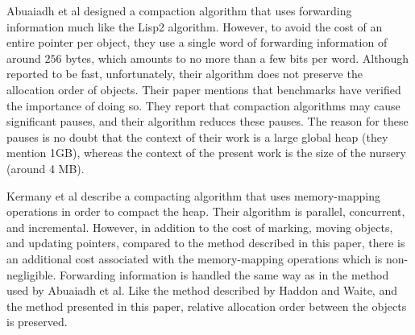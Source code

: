 Abuaiadh et al \cite{Abuaiadh:2004:EPH:1028976.1028995} designed a
compaction algorithm that uses forwarding information much like the
Lisp2 algorithm.  However, to avoid the cost of an entire pointer per
object, they use a single word of forwarding information of around
$256$ bytes, which amounts to no more than a few bits per word.
Although reported to be fast, unfortunately, their algorithm does not
preserve the allocation order of objects.  Their paper mentions that
benchmarks have verified the importance of doing so.  They report that
compaction algorithms may cause significant pauses, and their
algorithm reduces these pauses.  The reason for these pauses is no
doubt that the context of their work is a large global heap (they
mention 1GB), whereas the context of the present work is the size of
the nursery (around 4 MB).

Kermany et al \cite{Kermany:2006:CCI:1133981.1134023} describe a
compacting algorithm that uses memory-mapping operations in order to
compact the heap.  Their algorithm is parallel, concurrent, and
incremental.  However, in addition to the cost of marking, moving
objects, and updating pointers, compared to the method described in
this paper, there is an additional cost associated with the
memory-mapping operations which is non-negligible.  Forwarding
information is handled the same way as in the method used by Abuaiadh
et al.  Like the method described by Haddon and Waite, and the method
presented in this paper, relative allocation order between the objects
is preserved.
